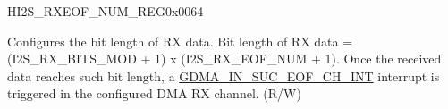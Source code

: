 \begin{register}{H}{I2S\_RXEOF\_NUM\_REG}{0x0064}\label{regdesc:I2SRXEOFNUMREG}
%
%
\regnewline%
\begin{regdesc}\begin{reglist}
\label{fielddesc:I2SRXEOFNUM}\item [I2S\_RX\_EOF\_NUM] Configures the bit length of RX data. Bit length of RX data = (I2S\_RX\_BITS\_MOD + 1) x (I2S\_RX\_EOF\_NUM + 1). Once the received data reaches such bit length, a \hyperref[int:GDMAINSUCEOFINT]{GDMA\_IN\_SUC\_EOF\_CH\_INT} interrupt is triggered in the configured DMA RX channel. (R/W)
\end{reglist}\end{regdesc}
\end{register}


